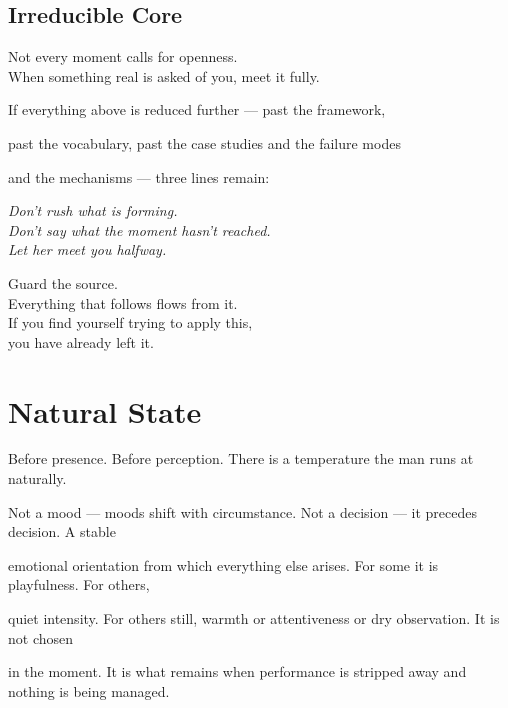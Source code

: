 \documentclass[12pt, a4paper]{article}
\begin{document}
\subsection*{Irreducible Core}

Not every moment calls for openness.\\
When something real is asked of you, meet it fully.


If everything above is reduced further --- past the framework,

past the vocabulary, past the case studies and the failure modes

and the mechanisms --- three lines remain:

\begin{center}

\emph{Don't rush what is forming.\\
Don't say what the moment hasn't reached.\\
Let her meet you halfway.}

\end{center}

\begin{calloutbox}

Guard the source.\\

Everything that follows flows from it.\\[0.6em]

If you find yourself trying to apply this,\\

you have already left it.

\end{calloutbox}

\section{Natural State}\label{sec:natural_state}

Before presence. Before perception. There is a temperature the man runs at naturally.

Not a mood --- moods shift with circumstance. Not a decision --- it precedes decision. A stable

emotional orientation from which everything else arises. For some it is playfulness. For others,

quiet intensity. For others still, warmth or attentiveness or dry observation. It is not chosen

in the moment. It is what remains when performance is stripped away and nothing is being managed.
\end{document}
